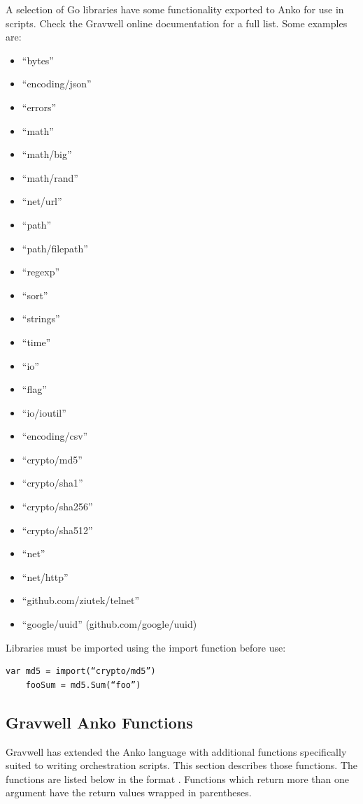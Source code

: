 A selection of Go libraries have some functionality exported to Anko for
use in scripts. Check the Gravwell online documentation for a full list.
Some examples are:

\begin{itemize}
\item ``bytes''
\item ``encoding/json''
\item ``errors''
\item ``math''
\item ``math/big''
\item ``math/rand''
\item ``net/url''
\item ``path''
\item ``path/filepath''
\item ``regexp''
\item ``sort''
\item ``strings''
\item ``time''
\item ``io''
\item ``flag''
\item ``io/ioutil''
\item ``encoding/csv''
\item ``crypto/md5''
\item ``crypto/sha1''
\item ``crypto/sha256''
\item ``crypto/sha512''
\item ``net''
\item ``net/http''
\item ``github.com/ziutek/telnet''
\item ``google/uuid'' (github.com/google/uuid)
\end{itemize}

Libraries must be imported using the import function before use:

\begin{Verbatim}[breaklines=true]
    var md5 = import(“crypto/md5”)
    fooSum = md5.Sum(“foo”)
\end{Verbatim}

\subsection{Gravwell Anko Functions}

Gravwell has extended the Anko language with additional functions
specifically suited to writing orchestration scripts. This section
describes those functions. The functions are listed below in the format
.
Functions which return more than one argument have the return values wrapped in parentheses.


